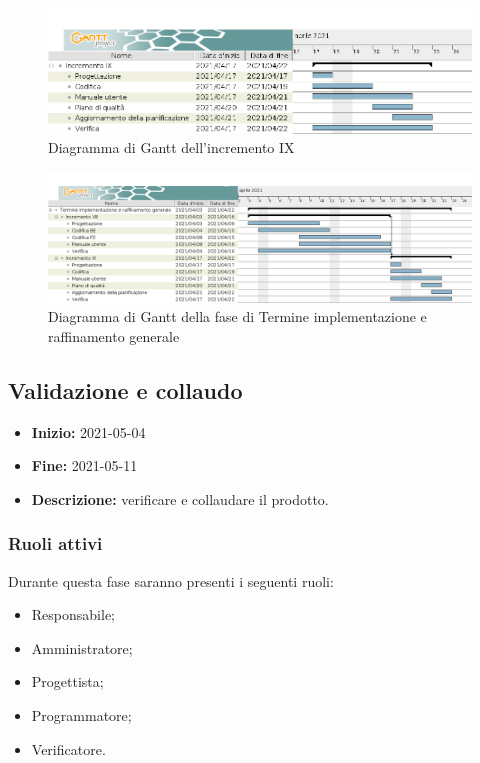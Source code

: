 \begin{figure}[H]
    \centering
    \includegraphics[width=1\linewidth]{res/images/pianificazione/incremento_9.png}
    \caption{Diagramma di Gantt dell'incremento IX}
    \label{fig:_Gantt incremento IX}
\end{figure}

\begin{figure}[H]
    \centering
    \includegraphics[width=1\linewidth]{res/images/pianificazione/termine_implementazione_e_raffinamento_generale.png}
    \caption{Diagramma di Gantt della fase di Termine implementazione e raffinamento generale}
    \label{fig:_Gantt termine implementazione e raffinamento generale}
\end{figure}


\subsection{Validazione e collaudo} \label{_pianificazioneValidazioneCollaudo}
\begin{itemize}
    \item [] \textbf{Inizio:} 2021-05-04
    \item [] \textbf{Fine:} 2021-05-11
    \item [] \textbf{Descrizione:} verificare e collaudare il prodotto.
\end{itemize}

\subsubsection{Ruoli attivi}
Durante questa fase saranno presenti i seguenti ruoli:
\begin{itemize}
    \item Responsabile;
    \item Amministratore;
    \item Progettista;
    \item Programmatore;
    \item Verificatore.
\end{itemize}

